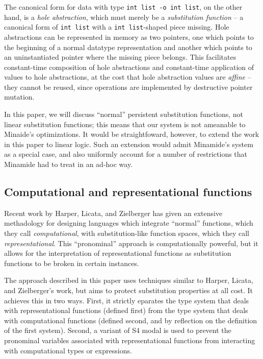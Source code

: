 \documentclass[twocolumn]{article}
\begin{document}
The canonical form for data with type \texttt{int list -o int list}, on the
other hand, is a {\it hole abstraction}, which must merely be a 
{\it substitution function} -- a canonical form of \texttt{int list}
with a \texttt{int list}-shaped piece missing. Hole abstractions 
can be represented
in memory as two pointers, one which points to the beginning of a normal
datatype representation and another which points to an uninstantiated
pointer where the missing piece belongs. This facilitates constant-time
composition of hole abstractions and constant-time application of values
to hole abstractions, at the cost that hole abstraction values are 
{\it affine} -- they cannot be reused, since operations are implemented 
by destructive pointer mutation.

In this paper, we will discuss ``normal'' 
persistent substitution functions, not linear 
substitution functions; this means that our system is not ameanable
to Minaide's optimizations. It would be straightfoward, however, to extend
the work in this paper to linear logic. Such an extension would admit
Minamide's system as a special case, and also uniformly account
for a number of restrictions that Minamide had to treat in an ad-hoc way.

\subsection{Computational and representational functions}

Recent work by Harper, Licata, and Zielberger 
\cite{licata08focusing,harper09pronominal,licata09universe}
has given an extensive methadology for designing languages which integrate
``normal'' functions, which they call {\it computational}, with 
substitution-like function spaces, which they call {\it representational}.
This ``pronominal'' approach is computationally powerful, but it allows
for the interpretation of representational functions as substitution functions
to be broken in certain instances. 

The approach described in this paper uses techniques similar to 
Harper, Licata, and Zielberger's work, but aims to protect substitution
properties at all cost. It achieves this in two ways. First, it strictly
eparates the type system that deals with representational
functions (defined first) from the type system that deals with computational
functions (defined second, and by reflection on the definition of the first
system). Second, a variant of S4 modal is used 
to prevent the pronominal variables associated with
representational functions from interacting with computational types or 
expressions.
\end{document}
